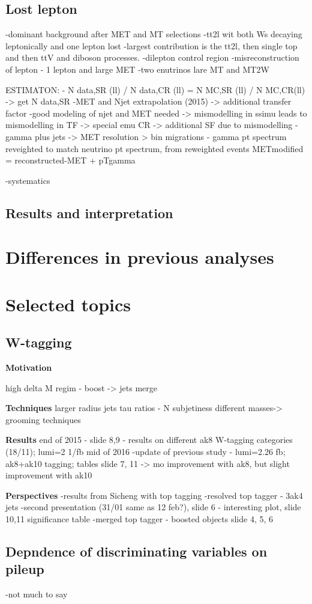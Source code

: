 \subsection{Lost lepton}

-dominant background after MET and MT selections
-tt2l wit both Ws decaying leptonically and one lepton lost
-largest contribution is the tt2l, then single top and then ttV and diboson processes.
-dilepton control region
-misreconstruction of lepton - 1 lepton and large MET
-two enutrinos lare MT and MT2W

ESTIMATON:
- N data,SR (ll) / N data,CR (ll) = N MC,SR (ll) / N MC,CR(ll) -> get N data,SR
-MET and Njet extrapolation (2015) -> additional transfer factor
-good modeling of njet and MET needed -> mismodelling in ssimu leads to mismodelling in TF -> special emu CR -> additional SF due to mismodelling
-gamma plus jets -> MET resolution > bin migrations - gamma pt spectrum reveighted to match neutrino pt spectrum, from reweighted events METmodified = reconstructed-MET + pTgamma


-systematics

\subsection{Results and interpretation}

\section{Differences in previous analyses}

\section{Selected topics}

\subsection{W-tagging}

\textbf{Motivation}

	high delta M regim - boost -> jets merge

\textbf{Techniques}
	larger radius jets
	tau ratios - N subjetiness
	different masses-> grooming techniques
	
\textbf{Results}
	end of 2015 - slide 8,9 - results on different ak8 W-tagging categories (18/11); lumi=2 1/fb
	mid of 2016 -update of previous study - lumi=2.26 fb; ak8+ak10 tagging; tables slide 7, 11 -> mo improvement with ak8, but slight improvement with ak10 


\textbf{Perspectives}
	-results from Sicheng with top tagging
	-resolved top tagger - 3ak4 jets
	-second presentation (31/01 same as 12 feb?), slide 6 - interesting plot, slide 10,11 significance table
        -merged top tagger - boosted objects
		slide 4, 5, 6

\subsection{Depndence of discriminating variables on pileup}
-not much to say
	

